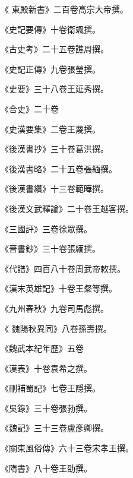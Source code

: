 \begin{pinyinscope}
 《
 東殿新書》二百卷高宗大帝撰。



 《史記要傳》十卷衛颯撰。



 《古史考》二十五卷譙周撰。



 《史記正傳》九卷張瑩撰。



 《史要》三十八卷王延秀撰。



 《合史》二十卷



 《史漢要集》二卷王蔑撰。



 《後漢書抄》三十卷葛洪撰。



 《後漢書略》二十五卷張緬撰。



 《後漢書纘》十三卷範曄撰。



 《後漢文武釋論》二十卷王越客撰。



 《三國評》三卷徐眾撰。



 《晉書鈔》三十卷張緬撰。



 《代譜》四百八十卷周武帝敕撰。



 《漢末英雄記》十卷王粲等撰。



 《九州春秋》九卷司馬彪撰。



 《
 魏陽秋異同》八卷孫壽撰。



 《魏武本紀年歷》五卷



 《漢表》十卷袁希之撰。



 《刪補蜀記》七卷王隱撰。



 《吳錄》三十卷張勃撰。



 《魏記》三十三卷盧彥卿撰。



 《關東風俗傳》六十三卷宋孝王撰。



 《隋書》八十卷王劭撰。




\end{pinyinscope}
